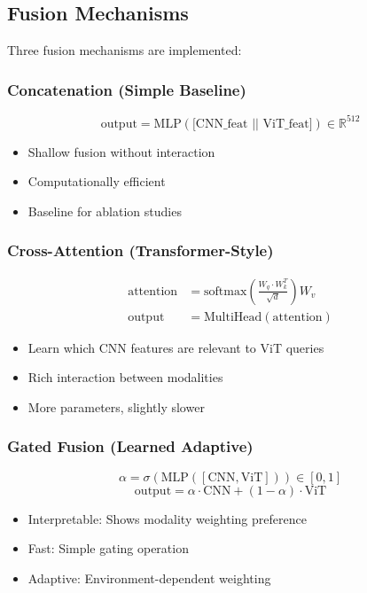 \documentclass[12pt,a4paper,openany]{report}
\begin{document}
\subsection{Fusion Mechanisms}

Three fusion mechanisms are implemented:

\subsubsection{Concatenation (Simple Baseline)}

\[
\text{output} = \text{MLP}(\text{[CNN\_feat || ViT\_feat]}) \in \mathbb{R}^{512}
\]

\begin{itemize}
    \item Shallow fusion without interaction
    \item Computationally efficient
    \item Baseline for ablation studies
\end{itemize}

\subsubsection{Cross-Attention (Transformer-Style)}

\begin{align*}
\text{attention} &= \text{softmax}\left(\frac{W_q \cdot W_k^T}{\sqrt{d}}\right) W_v \\
\text{output} &= \text{MultiHead}(\text{attention})
\end{align*}

\begin{itemize}
    \item Learn which CNN features are relevant to ViT queries
    \item Rich interaction between modalities
    \item More parameters, slightly slower
\end{itemize}

\subsubsection{Gated Fusion (Learned Adaptive)}

\[
\alpha = \sigma(\text{MLP}([\text{CNN}, \text{ViT}])) \in [0, 1]
\]
\[
\text{output} = \alpha \cdot \text{CNN} + (1-\alpha) \cdot \text{ViT}
\]

\begin{itemize}
    \item Interpretable: Shows modality weighting preference
    \item Fast: Simple gating operation
    \item Adaptive: Environment-dependent weighting
\end{itemize}
\end{document}
